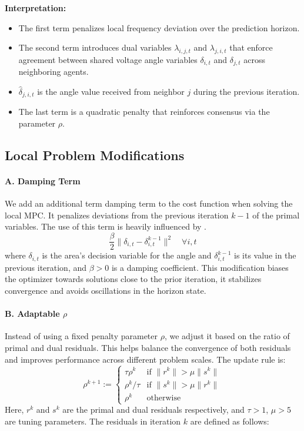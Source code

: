\documentclass{article}
\begin{document}
\textbf{Interpretation:}
\begin{itemize}
    \item The first term penalizes local frequency deviation over the prediction horizon.
    \item The second term introduces dual variables $\lambda_{i,j,t}$ and $\lambda_{j,i,t}$ that enforce agreement between shared voltage angle variables $\delta_{i,t}$ and $\delta_{j,t}$ across neighboring agents.
    \item $\hat{\delta}_{j,i,t}$ is the angle value received from neighbor $j$ during the previous iteration.
    \item The last term is a quadratic penalty that reinforces consensus via the parameter $\rho$.
\end{itemize}

\subsection{Local Problem Modifications}

\paragraph{A. Damping Term} 
We add an additional term damping term to the cost function when solving the local MPC. It penalizes deviations from the previous iteration $k-1$ of the primal variables. The use of this term is heavily influenced by \cite{ADMM:edu}.
\[
 \frac{\beta}{2} \|\delta_{i,t} - \delta_{i,t}^{k-1}\|^2 \quad \forall i,t
\]
where $\delta_{i,t}$ is the area's decision variable for the angle and  $\delta_{i,t}^{k-1}$ is its value in the previous iteration, and \( \beta > 0 \) is a damping coefficient. This modification biases the optimizer towards solutions close to the prior iteration, it stabilizes convergence and avoids oscillations in the horizon state.

\paragraph{B. Adaptable \(\rho\)} 


Instead of using a fixed penalty parameter \( \rho \), we adjust it based on the ratio of primal and dual residuals. This helps balance the convergence of both residuals and improves performance across different problem scales\cite{ADMM:boyd}. The update rule is:
\[
\rho^{k+1} := 
\begin{cases}
\tau \rho^k & \text{if } \|r^k\| > \mu \|s^k\| \\
\rho^k / \tau & \text{if } \|s^k\| > \mu \|r^k\| \\
\rho^k & \text{otherwise}
\end{cases}
\]
Here, \( r^k \) and \( s^k \) are the primal and dual residuals respectively, and \( \tau > 1 \), \( \mu > 5 \) are tuning parameters. The residuals in iteration $k$ are defined as follows:
\end{document}

